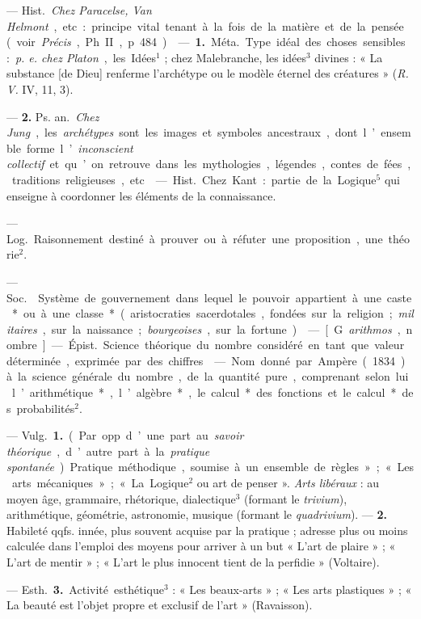 \begin{itemize}[leftmargin=1cm, label=, itemsep=1pt]
{{{{ — \si{Hist.} {\it Chez Paracelse, Van
Helmont}, etc. : principe vital tenant
à la fois de la matière et de la pensée
(voir {\it Précis}, Ph. II, p. 484).

 — {\bf 1.} \si{Méta.} Type idéal des
choses sensibles : {\it p. e. chez Platon},
les Idées$^1$ ; chez Malebranche, les
idées$^3$ divines : « La substance [de
Dieu] renferme l’archétype ou le
modèle éternel des créatures » ({\it R. V.}
IV, 11, 3).

— {\bf 2.} \si{Ps. an.} {\it Chez Jung}, les {\it archétypes} sont les images et symboles
ancestraux, dont l’ensemble forme
l’{\it inconscient collectif} et qu’on retrouve dans les mythologies,
légendes, contes de fées, traditions religieuses, etc.

 — \si{Hist.} Chez Kant :
partie de la Logique$^5$ qui enseigne à
coordonner les éléments de la connaissance.

 — \si{Log.} Raisonnement destiné à prouver ou à réfuter une
proposition, une théorie$^2$.

 — \si{Soc.}  Système de
gouvernement dans lequel le pouvoir appartient à une caste* ou à une
classe* (aristocraties sacerdotales,
fondées sur la religion; {\it militaires},
sur la naissance ; {\it bourgeoises}, sur la
fortune).

 — [G. {\it arithmos}, nombre]
— \si{Épist.} Science théorique du
nombre considéré en tant que valeur
déterminée, exprimée par des chiffres.

 — Nom donné par Ampère (1834) à la science générale du
nombre, de la quantité pure, comprenant selon lui l’arithmétique*,
l’algèbre*, le calcul* des fonctions
et le calcul* des probabilités$^2$.

 — \si{Vulg.} {\bf 1.} (Par opp. d’une part
au {\it savoir théorique}, d’autre part à la
{\it pratique spontanée}). Pratique méthodique, soumise à un ensemble de
règles » ; « Les arts mécaniques » ;
« La Logique$^2$ ou art de penser ».
{\it Arts libéraux} : au moyen âge, grammaire,
rhétorique, dialectique$^3$ (formant le {\it trivium}), arithmétique, géométrie,
astronomie, musique (formant le {\it quadrivium}). — {\bf 2.} Habileté
qqfs. innée, plus souvent acquise
par la pratique ; adresse plus ou
moins calculée dans l'emploi des
moyens pour arriver à un but
« L'art de plaire » ; « L'art de mentir » ;
« L'art le plus innocent tient de la
perfidie » (Voltaire).

— \si{Esth.} {\bf 3.} Activité esthétique$^3$ :
« Les beaux-arts » ; « Les arts plastiques » ; « La beauté est l’objet
propre et exclusif de l’art » (Ravaisson).

}}}}
\end{itemize}
